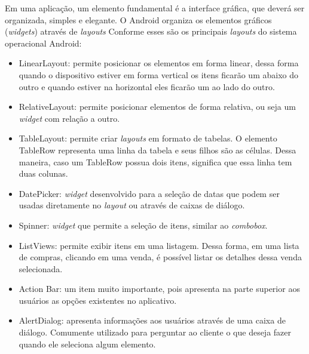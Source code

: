 	
	\par Em uma aplicação, um elemento fundamental é a interface gráfica, que
deverá ser organizada, simples e elegante. O Android organiza os elementos
gráficos (\textit{widgets}) através de \textit{layouts} Conforme
 esses são os principais \textit{layouts} do sistema
operacional Android:
	
		\begin{itemize}
		
			\item LinearLayout: permite posicionar os elementos em forma linear, dessa
			forma quando o dispositivo estiver em forma vertical os itens ficarão um
			abaixo do outro e quando estiver na horizontal eles ficarão um ao lado do
			outro.
			
			\item RelativeLayout: permite posicionar elementos de forma relativa, ou
			seja um \textit{widget} com relação a outro.
			
			\item TableLayout: permite criar \textit{layouts} em formato de tabelas. O
			elemento TableRow representa uma linha da tabela e seus filhos são as
			células.  Dessa maneira, caso um TableRow possua dois itens, significa que
			essa linha tem duas colunas.
			
			\item DatePicker: \textit{widget} desenvolvido para a seleção de datas que
			podem ser usadas diretamente no \textit{layout} ou através de caixas de
			diálogo.
		
			\item Spinner: \textit{widget} que permite a seleção de itens, similar ao
			\textit{combobox}.
			
			\item ListViews: permite exibir itens em uma listagem. Dessa forma, em uma
			lista de compras, clicando em uma venda, é possível listar os detalhes dessa
			venda selecionada.
			
			\item Action Bar: um item muito importante, pois apresenta na parte superior
			aos usuários as opções existentes no aplicativo.
			
			\item AlertDialog: apresenta informações aos usuários através de uma caixa
			de diálogo. Comumente utilizado para perguntar ao cliente o que deseja fazer
			quando ele seleciona algum elemento.
			

\end{itemize}
